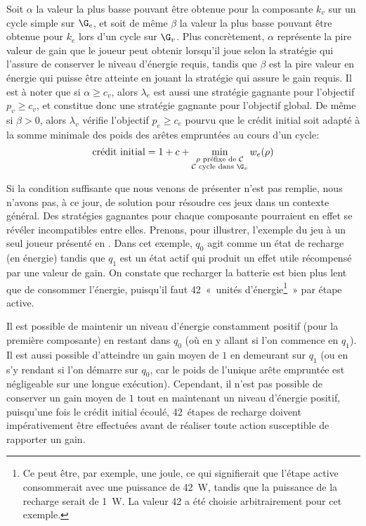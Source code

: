 Soit $\alpha$ la valeur la plus basse pouvant être obtenue pour la composante $k_v$ sur un cycle simple sur $\G_e$, et soit de même $\beta$ la valeur la plus basse pouvant être obtenue pour $k_e$ lors d'un cycle sur $\G_v$.
Plus concrètement, $\alpha$ représente la pire valeur de gain que le joueur peut obtenir lorsqu'il joue selon la stratégie qui l'assure de conserver le niveau d'énergie requis, tandis que $\beta$ est la pire valeur en énergie qui puisse être atteinte en jouant la stratégie qui assure le gain requis.
Il est à noter que si $\alpha \geq c_v$, alors $\lambda_e$ est aussi une stratégie gagnante pour l'objectif $p_v \geq c_v$, et constitue donc une stratégie gagnante pour l'objectif global.
De même si $\beta > 0$, alors $\lambda_v$ vérifie l'objectif $p_e \geq c_e$ pourvu que le crédit initial soit adapté à la somme minimale des poids des arêtes empruntées au cours d'un cycle:
\[\textrm{crédit initial} = 1+c+\min_{\substack{\rho \textrm{ préfixe de } \mathcal{C}\\
\mathcal{C}\textrm{ cycle dans } \G_v}} w_e(\rho)\]

\medskip

Si la condition suffisante que nous venons de présenter n'est pas remplie, nous n'avons pas, à ce jour, de solution pour résoudre ces jeux dans un contexte général.
Des stratégies gagnantes pour chaque composante pourraient en effet se révéler incompatibles entre elles.
Prenons, pour illustrer, l'exemple du jeu à un seul joueur présenté en .
Dans cet exemple, $q_0$ agit comme un état de recharge (en énergie) tandis que $q_1$ est un état actif qui produit un effet utile récompensé par une valeur de gain.
On constate que recharger la batterie est bien plus lent que de consommer l'énergie, puisqu'il faut 42 « unités d'énergie\footnote{Ce peut être, par exemple, une joule, ce qui signifierait que l'étape active consommerait avec une puissance de 42~W, tandis que la puissance de la recharge serait de 1~W. La valeur 42 a été choisie arbitrairement pour cet exemple.} » par étape active.

Il est possible de maintenir un niveau d'énergie constamment positif (pour la première composante) en restant dans $q_0$ (où en y allant si l'on commence en $q_1$).
Il est aussi possible d'atteindre un gain moyen de $1$ en demeurant sur $q_1$ (ou en s'y rendant si l'on démarre sur $q_0$, car le poids de l'unique arête empruntée est négligeable sur une longue exécution).
Cependant, il n'est pas possible de conserver un gain moyen de $1$ tout en maintenant un niveau d'énergie positif, puisqu'une fois le crédit initial écoulé, 42~étapes de recharge doivent impérativement être effectuées avant de réaliser toute action susceptible de rapporter un gain.

